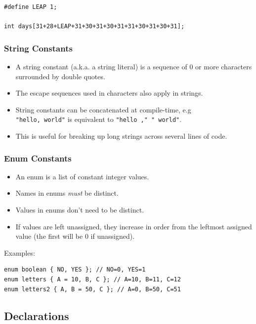 \documentclass{article}
\newcommand{\code}[1]{\texttt{#1}}
\begin{document}
\begin{lstlisting}
#define LEAP 1;

int days[31+28+LEAP+31+30+31+30+31+31+30+31+30+31];
\end{lstlisting}

\subsubsection{String Constants}

\begin{itemize}
    \item A string constant (a.k.a. a string literal) is a sequence of 0 or more characters surrounded by double quotes.
    \item The escape sequences used in characters also apply in strings.
    \item String constants can be concatenated at compile-time, e.g \\\code{"hello, world"} is equivalent to \code{"hello ," " world"}.
    \item This is useful for breaking up long strings across several lines of code.
\end{itemize}

\subsubsection{Enum Constants}

\begin{itemize}
    \item An enum is a list of constant integer values.
    \item Names in enums \emph{must} be distinct.
    \item Values in enums don't need to be distinct.
    \item If values are left unassigned, they increase in order from the leftmost assigned value (the first will be 0 if unassigned).
\end{itemize}

Examples:

\begin{lstlisting}
enum boolean { NO, YES }; // NO=0, YES=1
enum letters { A = 10, B, C }; // A=10, B=11, C=12
enum letters2 { A, B = 50, C }; // A=0, B=50, C=51
\end{lstlisting}

\subsection{Declarations}
\end{document}
